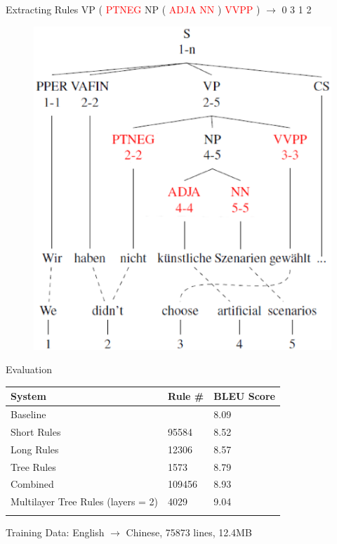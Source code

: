 \documentclass[18pt]{beamer}
\begin{document}
\begin{frame}{Extracting Rules {\hfill \small \color{black} VP ( \textcolor{red}{PTNEG} NP ( \textcolor{red}{ADJA NN} ) \textcolor{red}{VVPP} ) $\rightarrow$ 0 3 1 2}}
\begin{figure}
\centering
\includegraphics[scale=0.4]{extraction2.eps}
\end{figure}
\end{frame}

\begin{frame}{Evaluation}
\begin{tabular} {lll}
System & Rule \# & BLEU Score \\\hline
Baseline & & 8.09 \\
Short Rules & 95584 & 8.52 \\
Long Rules & 12306 & 8.57 \\
Tree Rules & 1573 & 8.79 \\
Combined & 109456 & 8.93 \\
Multilayer Tree Rules (layers = 2) & 4029 & 9.04 \\
\vspace{1cm}
\end{tabular}

Training Data: English $\rightarrow$ Chinese, 75873 lines, 12.4MB
\end{frame}
\end{document}
